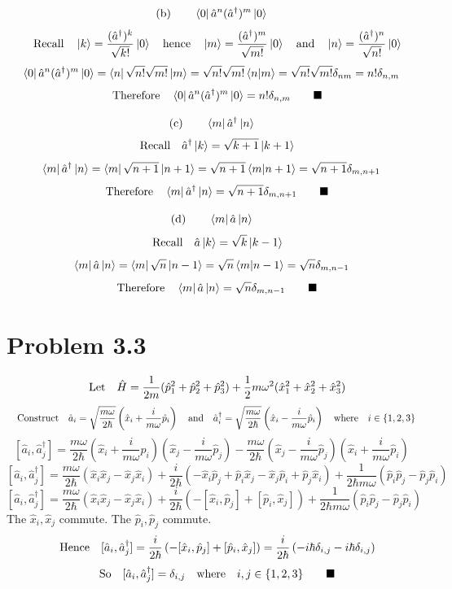 \documentclass{amsart}
\begin{document}
\[\text{(b)}\qquad\bra{0}\hat{a}^n(\hat{a}^\dagger)^m\ket{0}   \]
\[\qq{Recall} \ket{k}=\frac{(\hat{a}^\dagger)^k}{\sqrt{k!}}\ket{0}\qq{hence} \ket{m}=\frac{(\hat{a}^\dagger)^m}{\sqrt{m!}}\ket{0} \qq{and}\ket{n}=\frac{(\hat{a}^\dagger)^n}{\sqrt{n!}}\ket{0}\]
\[\bra{0}\hat{a}^n(\hat{a}^\dagger)^m\ket{0} =\bra{n}\sqrt{n!}\sqrt{m!}\ket{m}=\sqrt{n!}\sqrt{m!}\bra{n}\ket{m}=\sqrt{n!}\sqrt{m!}\delta_{nm}=n!\delta_{n,m}\]
\[\qq{Therefore}\bra{0}\hat{a}^n(\hat{a}^\dagger)^m\ket{0} =n!\delta_{n,m}\qquad\blacksquare\]

\[\text{(c)}\qquad\bra{m}\hat{a}^\dagger\ket{n}   \]
\[\qq{Recall}\hat{a}^\dagger\ket{k}=\sqrt{k+1}\ket{k+1}\]
\[\bra{m}\hat{a}^\dagger\ket{n} = \bra{m}\sqrt{n+1}\ket{n+1}  = \sqrt{n+1}\bra{m}\ket{n+1}=\sqrt{n+1}\delta_{m,n+1}\]
\[\qq{Therefore}\bra{m}\hat{a}^\dagger\ket{n}  =\sqrt{n+1}\delta_{m,n+1}\qquad\blacksquare\]

\[\text{(d)}\qquad\bra{m}\hat{a}\ket{n}   \]
\[\qq{Recall}\hat{a}\ket{k}=\sqrt{k}\ket{k-1}\]
\[\bra{m}\hat{a}\ket{n} = \bra{m}\sqrt{n}\ket{n-1}  = \sqrt{n}\bra{m}\ket{n-1}=\sqrt{n}\delta_{m,n-1}\]
\[\qq{Therefore}\bra{m}\hat{a}\ket{n}  =\sqrt{n}\delta_{m,n-1}\qquad\blacksquare\]

\section*{Problem 3.3}
\[\qq{Let}\hat{H}=\frac{1}{2m}(\hat{p}^2_1+\hat{p}^2_2+\hat{p}^2_3) + \frac{1}{2}m\omega^2(\hat{x}^2_1+\hat{x}^2_2+\hat{x}^2_3) \]
\[\qq{Construct}\hat{a}_i=\sqrt{\frac{m\omega}{2\hbar}}\left(\hat{x}_i+\frac{i}{m\omega}\hat{p}_i\right)\qq{and}\hat{a}^\dagger_i=\sqrt{\frac{m\omega}{2\hbar}}\left(\hat{x}_i-\frac{i}{m\omega}\hat{p}_i\right)\qq{where}i\in\{1,2,3\}\]
\[[\hat{a}_i,\hat{a}^\dagger_j]=\frac{m\omega}{2\hbar}\left(\hat{x}_i+\frac{i}{m\omega}\hat{p}_i\right)\left(\hat{x}_j-\frac{i}{m\omega}\hat{p}_j\right)-\frac{m\omega}{2\hbar}\left(\hat{x}_j-\frac{i}{m\omega}\hat{p}_j\right)\left(\hat{x}_i+\frac{i}{m\omega}\hat{p}_i\right)\]
\[[\hat{a}_i,\hat{a}^\dagger_j]=\frac{m\omega}{2\hbar}\left(\hat{x}_i\hat{x}_j-\hat{x}_j\hat{x}_i\right)+\frac{i}{2\hbar}\left(-\hat{x}_i\hat{p}_j+\hat{p}_i\hat{x}_j-\hat{x}_j\hat{p}_i+\hat{p}_j\hat{x}_i\right)+\frac{1}{2\hbar m\omega}\left(\hat{p}_i\hat{p}_j-\hat{p}_j\hat{p}_i\right)\]
\[[\hat{a}_i,\hat{a}^\dagger_j]=\frac{m\omega}{2\hbar}\left(\hat{x}_i\hat{x}_j-\hat{x}_j\hat{x}_i\right)+\frac{i}{2\hbar}\left(-[\hat{x}_i,\hat{p}_j]+[\hat{p}_i,\hat{x}_j]\right)+\frac{1}{2\hbar m\omega}\left(\hat{p}_i\hat{p}_j-\hat{p}_j\hat{p}_i\right)\]
The $\hat{x}_i,\hat{x}_j$ commute. The $\hat{p}_i,\hat{p}_j$ commute.
\[\qq{Hence}[\hat{a}_i,\hat{a}^\dagger_j]=\frac{i}{2\hbar}\left(-[\hat{x}_i,\hat{p}_j]+[\hat{p}_i,\hat{x}_j]\right)=\frac{i}{2\hbar}\left(-i\hbar\delta_{i,j}-i\hbar\delta_{i,j}\right)\]
\[\qq{So}[\hat{a}_i,\hat{a}^\dagger_j]=\delta_{i,j}\qq{where}i,j\in\{1,2,3\}\qquad\blacksquare\]
\end{document}
